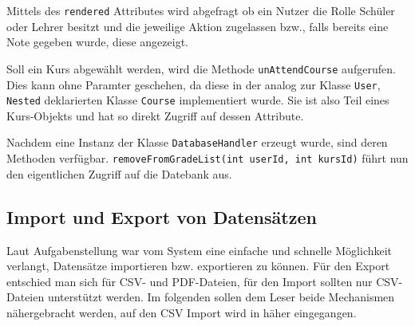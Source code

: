 Mittels des \texttt{rendered} Attributes wird abgefragt ob ein Nutzer die Rolle Schüler oder Lehrer besitzt und die jeweilige Aktion zugelassen bzw., falls bereits eine Note gegeben wurde, diese angezeigt. 
	
Soll ein Kurs abgewählt werden, wird die Methode \texttt{unAttendCourse} aufgerufen. Dies kann ohne Paramter geschehen, da diese in der analog zur Klasse \texttt{User}, \texttt{Nested}  deklarierten Klasse \texttt{Course} implementiert wurde. Sie ist also Teil eines Kurs-Objekts und hat so direkt Zugriff auf dessen Attribute. 
	
Nachdem eine Instanz der Klasse \texttt{DatabaseHandler} erzeugt wurde, sind deren Methoden verfügbar. \texttt{removeFromGradeList(int userId, int kursId)} führt nun den eigentlichen Zugriff auf die Datebank aus.	
		

\subsection{Import und Export von Datensätzen}
Laut Aufgabenstellung war vom System eine einfache und schnelle Möglichkeit verlangt, Datensätze importieren bzw. exportieren zu können.
Für den Export entschied man sich für CSV- und PDF-Dateien, für den Import sollten nur CSV-Dateien unterstützt werden.
Im folgenden sollen dem Leser beide Mechanismen nähergebracht werden, auf den CSV Import wird in  häher eingegangen. 

